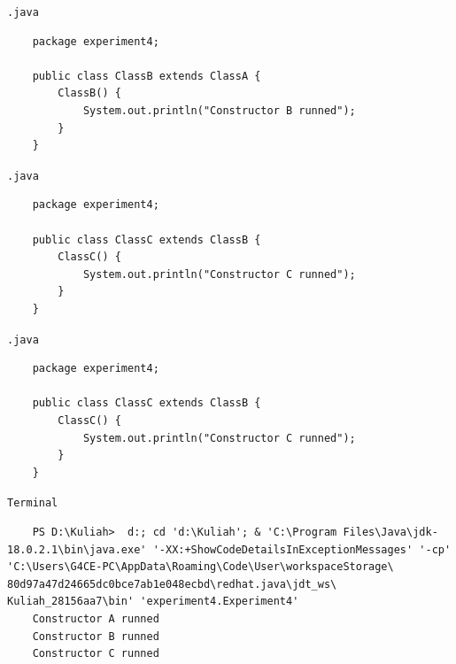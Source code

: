 \documentclass[12pt,titlepage]{article}
\begin{document}
\texttt{.java}
\begin{verbatim}
    package experiment4;

    public class ClassB extends ClassA {
        ClassB() {
            System.out.println("Constructor B runned");
        }
    }
\end{verbatim}

\texttt{.java}
\begin{verbatim}
    package experiment4;

    public class ClassC extends ClassB {
        ClassC() {
            System.out.println("Constructor C runned");
        }
    }
\end{verbatim}

\texttt{.java}
\begin{verbatim}
    package experiment4;

    public class ClassC extends ClassB {
        ClassC() {
            System.out.println("Constructor C runned");
        }
    }
\end{verbatim}

\newpage

\texttt{Terminal}
\begin{verbatim}
    PS D:\Kuliah>  d:; cd 'd:\Kuliah'; & 'C:\Program Files\Java\jdk-18.0.2.1\bin\java.exe' '-XX:+ShowCodeDetailsInExceptionMessages' '-cp' 'C:\Users\G4CE-PC\AppData\Roaming\Code\User\workspaceStorage\ 80d97a47d24665dc0bce7ab1e048ecbd\redhat.java\jdt_ws\ Kuliah_28156aa7\bin' 'experiment4.Experiment4'
    Constructor A runned
    Constructor B runned
    Constructor C runned
\end{verbatim}
\end{document}
